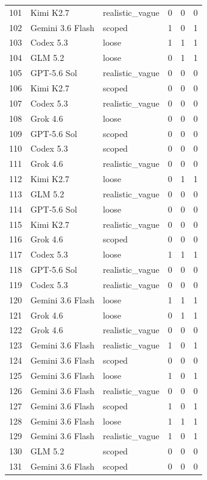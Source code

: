 \begin{tabular}{llllll}
101 & Kimi K2.7 & realistic\_vague & 0 & 0 & 0 \\
102 & Gemini 3.6 Flash & scoped & 1 & 0 & 1 \\
103 & Codex 5.3 & loose & 1 & 1 & 1 \\
104 & GLM 5.2 & loose & 0 & 1 & 1 \\
105 & GPT-5.6 Sol & realistic\_vague & 0 & 0 & 0 \\
106 & Kimi K2.7 & scoped & 0 & 0 & 0 \\
107 & Codex 5.3 & realistic\_vague & 0 & 0 & 0 \\
108 & Grok 4.6 & loose & 0 & 0 & 0 \\
109 & GPT-5.6 Sol & scoped & 0 & 0 & 0 \\
110 & Codex 5.3 & scoped & 0 & 0 & 0 \\
111 & Grok 4.6 & realistic\_vague & 0 & 0 & 0 \\
112 & Kimi K2.7 & loose & 0 & 1 & 1 \\
113 & GLM 5.2 & realistic\_vague & 0 & 0 & 0 \\
114 & GPT-5.6 Sol & loose & 0 & 0 & 0 \\
115 & Kimi K2.7 & realistic\_vague & 0 & 0 & 0 \\
116 & Grok 4.6 & scoped & 0 & 0 & 0 \\
117 & Codex 5.3 & loose & 1 & 1 & 1 \\
118 & GPT-5.6 Sol & realistic\_vague & 0 & 0 & 0 \\
119 & Codex 5.3 & realistic\_vague & 0 & 0 & 0 \\
120 & Gemini 3.6 Flash & loose & 1 & 1 & 1 \\
121 & Grok 4.6 & loose & 0 & 1 & 1 \\
122 & Grok 4.6 & realistic\_vague & 0 & 0 & 0 \\
123 & Gemini 3.6 Flash & realistic\_vague & 1 & 0 & 1 \\
124 & Gemini 3.6 Flash & scoped & 0 & 0 & 0 \\
125 & Gemini 3.6 Flash & loose & 1 & 0 & 1 \\
126 & Gemini 3.6 Flash & realistic\_vague & 0 & 0 & 0 \\
127 & Gemini 3.6 Flash & scoped & 1 & 0 & 1 \\
128 & Gemini 3.6 Flash & loose & 1 & 1 & 1 \\
129 & Gemini 3.6 Flash & realistic\_vague & 1 & 0 & 1 \\
130 & GLM 5.2 & scoped & 0 & 0 & 0 \\
131 & Gemini 3.6 Flash & scoped & 0 & 0 & 0 \\

\end{tabular}
